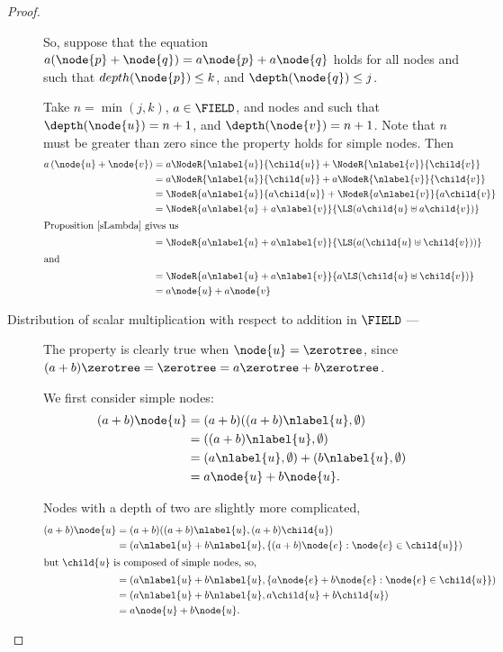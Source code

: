 \begin{proposition}
\begin{proof}
\begin{description}
      So, suppose that the equation $a ( \node{p} + \node{q}) =
      a \node{p} + a \node{q}$ holds for all nodes  and
       such that $depth(\node{p}) \leq k$, and
      $\depth(\node{q}) \leq j$.

      Take $n = \min(j, k)$, $a\in\FIELD$, and nodes  and  such that
      $\depth(\node{u}) = n+1$, and $\depth(\node{v}) = n+1$.
      Note that $n$ must be greater than zero since the property holds for simple
      nodes.  Then
      \begin{align*}
        a \left(\node{u} + \node{v}\right) &= a \NodeR{\nlabel{u}}{\child{u}} + \NodeR{\nlabel{v}}{\child{v}}\\
        &= a\NodeR{\nlabel{u}}{\child{u}} + a\NodeR{\nlabel{v}}{\child{v}}\\        
        &= \NodeR{a \nlabel{u}}{a \child{u}} + \NodeR{a \nlabel{v}}{a \child{v}}\\
        &= \NodeR{a \nlabel{u} + a \nlabel{v}}{\LS(a \child{u} \uplus a \child{v})}\\
        \intertext{Proposition \ref{sLambda} gives us}
        &= \NodeR{a \nlabel{u} + a \nlabel{v}}{\LS(a(\child{u} \uplus \child{v}))}\\
        \intertext{and }
        &= \NodeR{a \nlabel{u} + a \nlabel{v}}{a \LS(\child{u} \uplus \child{v})}\\
        &= a\node{u} + a\node{v}
      \end{align*}

    \item[Distribution of scalar multiplication with respect to addition in $\FIELD$  --- ]

      The property is clearly true when $\node{u} = \zerotree$,
      since $(a+b)\zerotree = \zerotree = a\zerotree+b\zerotree$.

      We first consider simple nodes:
      \begin{align*}
        (a + b)\node{u} &= (a + b) ((a + b)\nlabel{u}, \emptyset) \\
        &= ((a + b)\nlabel{u}, \emptyset) \\
        &= (a\nlabel{u}, \emptyset) + (b\nlabel{u}, \emptyset) \\
        &= a \node{u} + b \node{u}.
      \end{align*}

      Nodes with a depth of two are slightly more complicated, 
      \begin{align*}
        (a + b)\node{u} &= (a + b) ((a + b)\nlabel{u}, (a + b)\child{u}) \\
        &= (a\nlabel{u} + b\nlabel{u}, \{(a + b)\node{e}:\node{e}\in\child{u}\}) \\
        \intertext{but $\child{u}$ is composed of simple nodes, so,}
        &= (a\nlabel{u} + b\nlabel{u}, \{a \node{e} + b \node{e}:\node{e}\in\child{u}\}) \\
        &= (a\nlabel{u} + b\nlabel{u}, a\child{u} + b\child{u}) \\
        &= a \node{u} + b\node{u}.
      \end{align*}


\end{description}
\end{proof}
\end{proposition}
